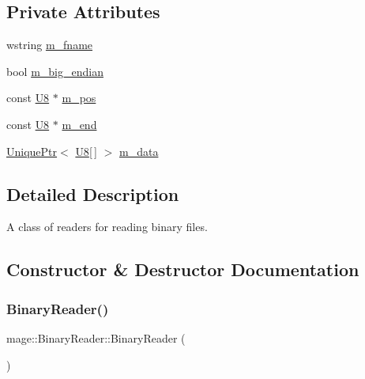 \subsection*{Private Attributes}
\begin{DoxyCompactItemize}
\item 
wstring \hyperlink{classmage_1_1_binary_reader_a9c97c02d53ce60a9952751ad4f55414f}{m\+\_\+fname}
\item 
bool \hyperlink{classmage_1_1_binary_reader_a8d23fde958e08efe248edb5d92861113}{m\+\_\+big\+\_\+endian}
\item 
const \hyperlink{namespacemage_afc638980bc6154f15af5e2d93a0e0ea9}{U8} $\ast$ \hyperlink{classmage_1_1_binary_reader_aedb9632de1cf95d5af49499217744ed5}{m\+\_\+pos}
\item 
const \hyperlink{namespacemage_afc638980bc6154f15af5e2d93a0e0ea9}{U8} $\ast$ \hyperlink{classmage_1_1_binary_reader_a19b0f36cb1e8a05aaa9471514242e8ef}{m\+\_\+end}
\item 
\hyperlink{namespacemage_a3316d7143a973e37adf1110f2e80ca31}{Unique\+Ptr}$<$ \hyperlink{namespacemage_afc638980bc6154f15af5e2d93a0e0ea9}{U8}\mbox{[}$\,$\mbox{]} $>$ \hyperlink{classmage_1_1_binary_reader_a529bdcb620e1250aa0b12716c9b7eae1}{m\+\_\+data}
\end{DoxyCompactItemize}


\subsection{Detailed Description}
A class of readers for reading binary files. 

\subsection{Constructor \& Destructor Documentation}
\hypertarget{classmage_1_1_binary_reader_aab82579cef4f2f022273cf1adfcc8497}{}\label{classmage_1_1_binary_reader_aab82579cef4f2f022273cf1adfcc8497} 
\subsubsection{\texorpdfstring{Binary\+Reader()}{BinaryReader()}\hspace{0.1cm}{\footnotesize\ttfamily [1/3]}}
{\footnotesize\ttfamily mage\+::\+Binary\+Reader\+::\+Binary\+Reader (\begin{DoxyParamCaption}{ }\end{DoxyParamCaption})\hspace{0.3cm}{\ttfamily [protected]}}

